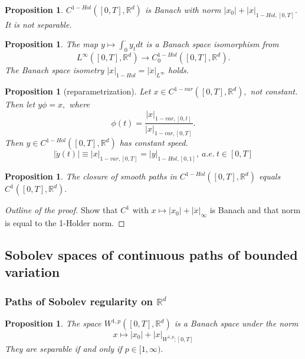 \documentclass{article}
\newcommand{\R}{\mathbb{R}}
\newtheorem{prop}[theorem]{Proposition}
\begin{document}
\begin{prop}
    $C^{1-Hol}([0,T], \R^d)$ is Banach with norm $|x_0| + |x|_{1-Hol,[0,T]}.$ It is not separable.
\end{prop}

\begin{prop}
    The map $y \mapsto \int_0^{\cdot} y_t dt$ is a Banach space isomorphism from 
    \begin{equation}
        L^{\infty}([0,T], \R^d) \rightarrow C_0^{1-Hol}([0,T], \R^d).
    \end{equation}
    The Banach space isometry $|x|_{1-Hol} = |\dot{x}|_{L^{\infty}}$ holds.
\end{prop}

\begin{prop}[reparametrization]
    Let $x \in C^{1-var}([0,T], \R^d),$ not constant. Then let $y\phi = x,$ where 
    \begin{equation}
        \phi(t) = \frac{|x|_{1-var, [0,t]}}{|x|_{1-var, [0,T]}}.
    \end{equation}
    Then $y \in C^{1-Hol}([0,T], \R^d)$ has constant speed.
    \begin{equation}
        |\dot{y}(t)| \equiv |x|_{1-var, [0,T]} = |y|_{1-Hol,[0,1]}, \ a.e.\ t \in [0,T]
    \end{equation}
\end{prop}

\begin{prop}
    The closure of smooth paths in $C^{1-Hol}([0,T],\R^d)$ equals $C^1([0,T], \R^d).$
\end{prop}
\begin{proof}[Outline of the proof]
    Show that $C^1$ with $x \mapsto |x_0| + |\dot{x}|_{\infty}$ is Banach and that norm is equal to the 1-Holder norm. 
\end{proof}

\subsection{Sobolev spaces of continuous paths of bounded
variation}

\subsubsection{Paths of Sobolev regularity on $\R^d$}

\begin{prop}
    The space $W^{1,p}([0,T],\R^d)$ is a Banach space under the norm
    \begin{equation}
        x \mapsto |x_0| + |x|_{W^{1,p};[0,T]}
    \end{equation}
    They are separable if and only if $p \in [1, \infty).$
\end{prop}
\end{document}
